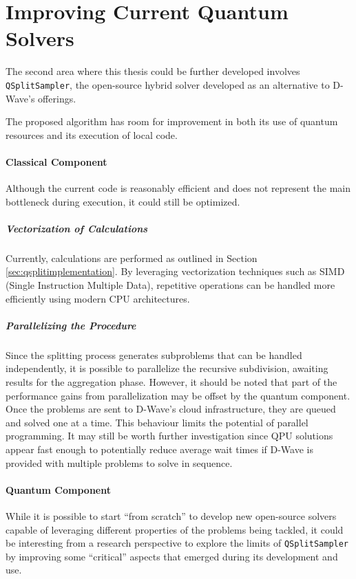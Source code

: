 \section{Improving Current Quantum Solvers}\label{sec:bettersolver}

The second area where this thesis could be further developed involves \texttt{QSplitSampler}, the open-source hybrid solver developed as an alternative to D-Wave's offerings.

The proposed algorithm has room for improvement in both its use of quantum resources and its execution of local code.

\paragraph{Classical Component} Although the current code is reasonably efficient and does not represent the main bottleneck during execution, it could still be optimized.

\subparagraph{Vectorization of Calculations} Currently, calculations are performed as outlined in Section \ref{sec:qsplitimplementation}. By leveraging vectorization techniques such as SIMD (Single Instruction Multiple Data), repetitive operations can be handled more efficiently using modern CPU architectures.

\subparagraph{Parallelizing the Procedure} Since the splitting process generates subproblems that can be handled independently, it is possible to parallelize the recursive subdivision, awaiting results for the aggregation phase. However, it should be noted that part of the performance gains from parallelization may be offset by the quantum component. Once the problems are sent to D-Wave's cloud infrastructure, they are queued and solved one at a time. This behaviour limits the potential of parallel programming. It may still be worth further investigation since QPU solutions appear fast enough to potentially reduce average wait times if D-Wave is provided with multiple problems to solve in sequence.

\paragraph{Quantum Component} While it is possible to start ``from scratch'' to develop new open-source solvers capable of leveraging different properties of the problems being tackled, it could be interesting from a research perspective to explore the limits of \texttt{QSplitSampler} by improving some ``critical'' aspects that emerged during its development and use.

